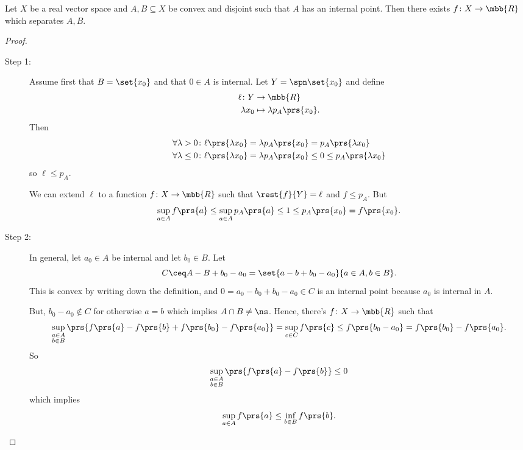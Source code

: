 \documentclass[10pt, twoside]{book}
\begin{document}
\begin{theorem}
Let $X$ be a real vector space and $A,B \subseteq X$ be convex and disjoint such that $A$ has an internal point. Then there exists $f \colon X \to \mbb{R}$ which separates $A,B$.
\end{theorem}

\begin{proof}
\begin{description}
\item[Step 1:]
Assume first that $B = \set{x_0}$ and that $0 \in A$ is internal.
Let $Y = \spn\set{x_0}$ and define
\begin{align*}
\ell \colon Y &\to \mbb{R} \\
\lambda x_0 &\mapsto \lambda p_A\prs{x_0} \text{.}
\end{align*}
Then
\begin{align*}
\forall \lambda >0 \colon \ell\prs{\lambda x_0} &= \lambda p_A\prs{x_0} = p_A\prs{\lambda x_0} \\
\forall \lambda \leq 0 \colon \ell\prs{\lambda x_0} &= \lambda p_A\prs{x_0} \leq 0 \leq p_A\prs{\lambda x_0}
\end{align*}
so $\ell \leq p_A$.

We can extend $\ell$ to a function $f \colon X \to \mbb{R}$ such that $\rest{f}{Y} = \ell$ and $f \leq p_A$.
But
\[\sup_{a \in A} f\prs{a} \leq \sup_{a \in A} p_A\prs{a} \leq 1 \leq p_A\prs{x_0} = f\prs{x_0} \text{.}\]

\item[Step 2:]
In general, let $a_0 \in A$ be internal and let $b_0 \in B$. Let
\[C \ceq A - B + b_0 - a_0 = \set{a-b + b_0 - a_0}{a \in A, b \in B} \text{.}\]
This is convex by writing down the definition, and $0 = a_0 - b_0 + b_0 - a_0 \in C$ is an internal point because $a_0$ is internal in $A$.

But, $b_0 - a_0 \notin C$ for otherwise $a=b$ which implies $A \cap B \neq \ns$. Hence, there's $f \colon X \to \mbb{R}$ such that
\[\sup_{\substack{a \in A \\ b \in B}}\prs{f\prs{a} - f\prs{b} + f\prs{b_0} - f\prs{a_0}} = \sup_{c \in C} f\prs{c} \leq f\prs{b_0 - a_0} = f\prs{b_0} - f\prs{a_0}\text{.}\]
So
\[\sup_{\substack{a \in A \\ b \in B}} \prs{f\prs{a} - f\prs{b}} \leq 0\]
which implies
\[\sup_{a \in A} f\prs{a} \leq \inf_{b \in B} f\prs{b} \text{.}\] 
\end{description}
\end{proof}
\end{document}
